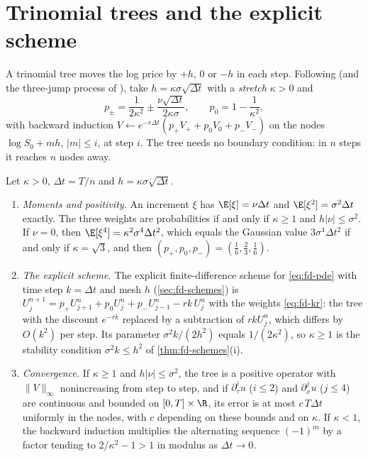 \section{Trinomial trees and the explicit scheme}\label{sec:fd-trinomial}

A trinomial tree moves the log price by $+h$, $0$ or $-h$ in each step. Following
\textcite{kamrad-ritchken-1991} (and the three-jump process of \textcite{boyle-1986}), take
$h=\kappa\sigma\sqrt{\Delta t}$ with a \emph{stretch} $\kappa>0$ and
\begin{equation}\label{eq:fd-kr}
  p_\pm=\frac1{2\kappa^2}\pm\frac{\nu\sqrt{\Delta t}}{2\kappa\sigma},\qquad p_0=1-\frac1{\kappa^2},
\end{equation}
with backward induction $V\leftarrow e^{-r\Delta t}(p_+V_++p_0V_0+p_-V_-)$ on the nodes
$\log S_0+mh$, $|m|\le i$, at step $i$. The tree needs no boundary condition: in $n$ steps it reaches
$n$ nodes away.

\begin{proposition}\label{prop:fd-trinomial}
Let $\kappa>0$, $\Delta t=T/n$ and $h=\kappa\sigma\sqrt{\Delta t}$.
\begin{enumerate}[label=(\roman*)]
  \item \emph{Moments and positivity.} An increment $\xi$ has $\E[\xi]=\nu\Delta t$ and
    $\E[\xi^2]=\sigma^2\Delta t$ exactly. The three weights are probabilities if and only if $\kappa\ge1$ and
    $h|\nu|\le\sigma^2$. If $\nu=0$, then $\E[\xi^4]=\kappa^2\sigma^4\Delta t^2$, which equals the Gaussian value
    $3\sigma^4\Delta t^2$ if and only if $\kappa=\sqrt3$, and then $(p_+,p_0,p_-)=(\frac16,\frac23,\frac16)$.
  \item \emph{The explicit scheme.} The explicit finite-difference scheme for \eqref{eq:fd-pde}
    with time step $k=\Delta t$ and mesh $h$ (\cref{sec:fd-schemes}) is
    $U^{n+1}_j=p_+U^n_{j+1}+p_0U^n_j+p_-U^n_{j-1}-rk\,U^n_j$ with the weights \eqref{eq:fd-kr}: the tree with
    the discount $e^{-rk}$ replaced by a subtraction of $rkU^n_j$, which differs by $O(k^2)$ per step.
    Its parameter $\sigma^2k/(2h^2)$ equals $1/(2\kappa^2)$, so $\kappa\ge1$ is the stability condition
    $\sigma^2k\le h^2$ of \cref{thm:fd-schemes}(i).
  \item \emph{Convergence.} If $\kappa\ge1$ and $h|\nu|\le\sigma^2$, the tree is a positive operator
    with $\|V\|_\infty$ nonincreasing from step to step, and if $\partial_\tau^iu$ ($i\le2$) and
    $\partial_x^ju$ ($j\le4$) are continuous and bounded on $[0,T]\times\R$, its error is at most
    $c\,T\Delta t$ uniformly in the nodes, with $c$ depending on these bounds and on $\kappa$. If $\kappa<1$, the
    backward induction multiplies the alternating sequence $(-1)^m$ by a factor tending to
    $2/\kappa^2-1>1$ in modulus as $\Delta t\to0$.
\end{enumerate}
\end{proposition}


